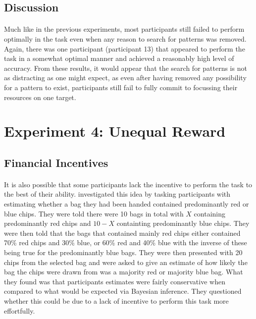 \documentclass[12pt]{article}
\begin{document}
\subsection*{Discussion}
\paragraph{} Much like in the previous experiments, most participants still failed to perform optimally in the task even when any reason to search for patterns was removed. Again, there was one participant (participant 13) that appeared to perform the task in a somewhat optimal manner and achieved a reasonably high level of accuracy. From these results, it would appear that the search for patterns is not as distracting as one might expect, as even after having removed any possibility for a pattern to exist, participants still fail to fully commit to focussing their resources on one target.


\section*{Experiment 4: Unequal Reward}

\subsection*{Financial Incentives}

\paragraph{} It is also possible that some participants lack the incentive to perform the task to the best of their ability. \cite{phillips1966conservatism} investigated this idea by tasking participants with estimating whether a bag they had been handed contained predominantly red or blue chips. They were told there were 10 bags in total with $X$ containing predominantly red chips and $10 - X$ containting predominantly blue chips. They were then told that the bags that contained mainly red chips either contained 70\% red chips and 30\% blue, or 60\% red and 40\% blue with the inverse of these being true for the predominantly blue bags. They were then presented with 20 chips from the selected bag and were asked to give an estimate of how likely the bag the chips were drawn from was a majority red or majority blue bag. What they found was that participants estimates were fairly conservative when compared to what would be expected via Bayesian inference. They questioned whether this could be due to a lack of incentive to perform this task more effortfully. 
\end{document}
